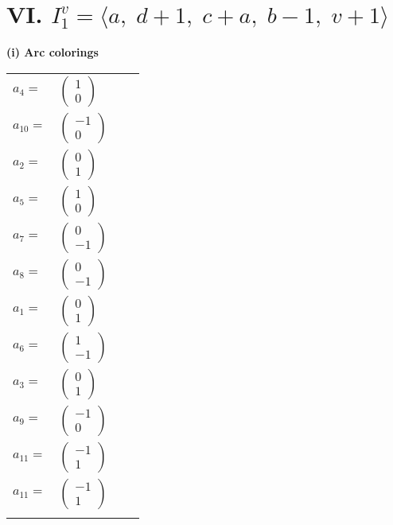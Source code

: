 \documentclass[1p]{elsarticle_modified}
\theoremstyle{definition}
\begin{document}
\centering \section*{VI. $I^v_{1}= \langle a,\;d+1,\;c+a,\;b-1,\;v+1 \rangle$}
\flushleft \textbf{(i) Arc colorings}\\
\begin{tabular}{m{7pt} m{180pt} m{7pt} m{180pt} }
\flushright $a_{4}=$&$\begin{pmatrix}1\\0\end{pmatrix}$ \\
\flushright $a_{10}=$&$\begin{pmatrix}-1\\0\end{pmatrix}$ \\
\flushright $a_{2}=$&$\begin{pmatrix}0\\1\end{pmatrix}$ \\
\flushright $a_{5}=$&$\begin{pmatrix}1\\0\end{pmatrix}$ \\
\flushright $a_{7}=$&$\begin{pmatrix}0\\-1\end{pmatrix}$ \\
\flushright $a_{8}=$&$\begin{pmatrix}0\\-1\end{pmatrix}$ \\
\flushright $a_{1}=$&$\begin{pmatrix}0\\1\end{pmatrix}$ \\
\flushright $a_{6}=$&$\begin{pmatrix}1\\-1\end{pmatrix}$ \\
\flushright $a_{3}=$&$\begin{pmatrix}0\\1\end{pmatrix}$ \\
\flushright $a_{9}=$&$\begin{pmatrix}-1\\0\end{pmatrix}$ \\
\flushright $a_{11}=$&$\begin{pmatrix}-1\\1\end{pmatrix}$\\ \flushright $a_{11}=$&$\begin{pmatrix}-1\\1\end{pmatrix}$\\&\end{tabular}
\end{document}
